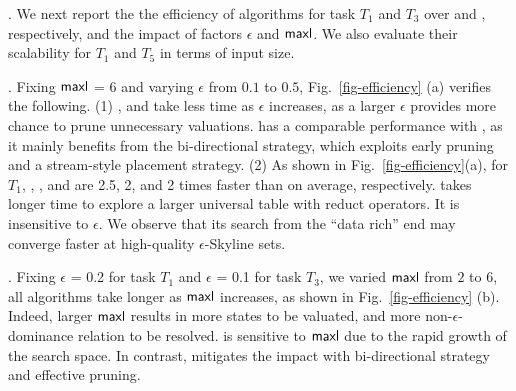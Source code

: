 . 
We next report the 
the efficiency of \modis algorithms 
for task $T_1$ and $T_3$ over \kaggle and \hf, respectively, and 
the impact of factors 
$\epsilon$ and ${\mathsf{maxl}}$. 
We also evaluate their scalability for $T_1$ and $T_5$ in terms of input size.

. 
Fixing ${\mathsf{maxl}}$ = $6$ and varying $\epsilon$ from $0.1$ to $0.5$, 
Fig.~\ref{fig-efficiency} (a)
verifies the following. 
(1) \bimodis, \nomodis and \divmodis take less time as $\epsilon$ increases, as a larger $\epsilon$ provides more chance to prune unnecessary valuations. 
\divmodis has a comparable performance 
with \nomodis, as it mainly benefits from 
the bi-directional strategy, which exploits early pruning and a stream-style placement strategy. 
(2) As shown in Fig.~\ref{fig-efficiency}(a), for  $T_1$, \bimodis, \nomodis, and \divmodis are 2.5, 2, and 2 times faster than \apxmodis on average, respectively. 
\apxmodis takes longer time to explore a larger  universal table with reduct operators. 
It is insensitive to $\epsilon$. We observe that its search from the ``data rich'' end   
may converge faster at high-quality 
$\epsilon$-Skyline sets. 


. 
Fixing $\epsilon$ = 0.2 for task $T_1$ and $\epsilon$ = 0.1 for task $T_3$, we varied ${\mathsf{maxl}}$ from $2$ to $6$, all \modis algorithms take longer as ${\mathsf{maxl}}$ increases, as shown in Fig.~\ref{fig-efficiency} (b). 
Indeed, larger ${\mathsf{maxl}}$ results in more states to be valuated, and more non-$\epsilon$-dominance relation to be resolved. \apxmodis is sensitive to ${\mathsf{maxl}}$  due to the rapid growth of the search space. In contrast, \bimodis mitigates the impact with bi-directional strategy and effective pruning.


